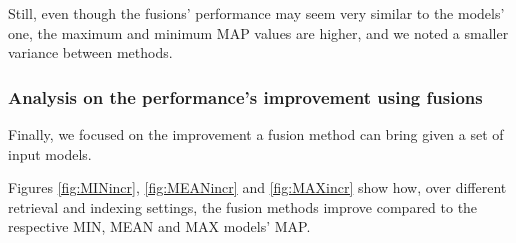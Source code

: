 {	Still, even though the fusions' performance may seem very similar to the models' one, the maximum and minimum MAP values are higher, and we noted a smaller variance between methods. 

	\subsubsection{Analysis on the performance's improvement using fusions}
	
	Finally, we focused on the improvement a fusion method can bring given a set of input models.
	
	Figures \ref{fig:MINincr}, \ref{fig:MEANincr} and \ref{fig:MAXincr} show how, over different retrieval and indexing settings, the fusion methods improve compared to the respective MIN, MEAN and MAX models' MAP.
	
}
